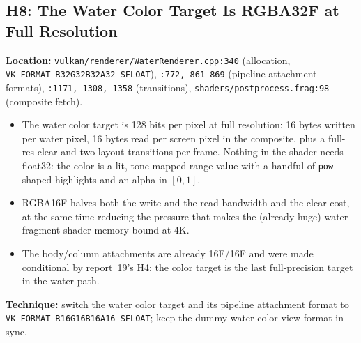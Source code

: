 \documentclass[11pt,a4paper]{article}
\begin{document}
\subsection{H8: The Water Color Target Is RGBA32F at Full Resolution}

\textbf{Location:} \texttt{vulkan/renderer/WaterRenderer.cpp:340} (allocation, \texttt{VK\_FORMAT\_R32G32B32A32\_SFLOAT}),
\texttt{:772, 861--869} (pipeline attachment formats), \texttt{:1171, 1308, 1358} (transitions),
\texttt{shaders/postprocess.frag:98} (composite fetch).

\begin{itemize}
    \item The water color target is 128 bits per pixel at full resolution: 16 bytes written per water pixel, 16 bytes
    read per screen pixel in the composite, plus a full-res clear and two layout transitions per frame. Nothing in the
    shader needs float32: the color is a lit, tone-mapped-range value with a handful of \texttt{pow}-shaped highlights
    and an alpha in $[0,1]$.
    \item RGBA16F halves both the write and the read bandwidth and the clear cost, at the same time reducing the
    pressure that makes the (already huge) water fragment shader memory-bound at 4K.
    \item The body/column attachments are already 16F/16F and were made conditional by report~19's H4; the color target
    is the last full-precision target in the water path.
\end{itemize}

\textbf{Technique:} switch the water color target and its pipeline attachment format to
\texttt{VK\_FORMAT\_R16G16B16A16\_SFLOAT}; keep the dummy water color view format in sync.
\end{document}
